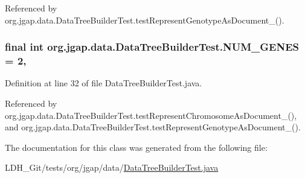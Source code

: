 Referenced by org.\-jgap.\-data.\-Data\-Tree\-Builder\-Test.\-test\-Represent\-Genotype\-As\-Document\-\_().

\hypertarget{classorg_1_1jgap_1_1data_1_1_data_tree_builder_test_a4e22d9af8e2f651acebeb91c55ea7f66}{
\subsubsection[{N\-U\-M\-\_\-\-G\-E\-N\-E\-S}]{\setlength{\rightskip}{0pt plus 5cm}final int org.\-jgap.\-data.\-Data\-Tree\-Builder\-Test.\-N\-U\-M\-\_\-\-G\-E\-N\-E\-S = 2\hspace{0.3cm}{\ttfamily [static]}, {\ttfamily [private]}}}\label{classorg_1_1jgap_1_1data_1_1_data_tree_builder_test_a4e22d9af8e2f651acebeb91c55ea7f66}


Definition at line 32 of file Data\-Tree\-Builder\-Test.\-java.



Referenced by org.\-jgap.\-data.\-Data\-Tree\-Builder\-Test.\-test\-Represent\-Chromosome\-As\-Document\-\_(), and org.\-jgap.\-data.\-Data\-Tree\-Builder\-Test.\-test\-Represent\-Genotype\-As\-Document\-\_().



The documentation for this class was generated from the following file\-:\begin{DoxyCompactItemize}
\item 
L\-D\-H\-\_\-\-Git/tests/org/jgap/data/\hyperlink{_data_tree_builder_test_8java}{Data\-Tree\-Builder\-Test.\-java}\end{DoxyCompactItemize}
